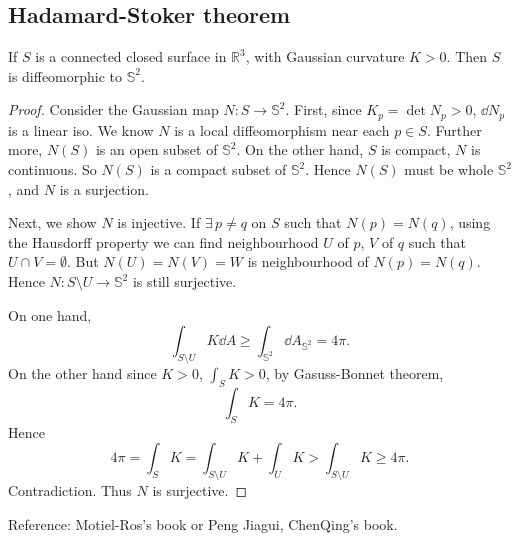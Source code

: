 \subsection{Hadamard-Stoker theorem}
\begin{theorem}
    If \(S\) is a connected closed surface in \(\mathbb{R}^3\), with Gaussian
    curvature \(K>0\). Then \(S\) is diffeomorphic to \(\mathbb{S}^2\).
\end{theorem}
\begin{proof}
    Consider the Gaussian map \(N\colon S\to \mathbb{S}^2\). First, since \(K_p=
    \det N_p>0\), \(\dd{N_p}\) is a linear iso. We know \(N\) is a local diffeomorphism
    near each \(p\in S\). Further more, \(N(S)\) is an open subset of \(\mathbb{S}^2\).
    On the other hand, \(S\) is compact, \(N\) is continuous. So \(N(S)\) is a
    compact subset of \(\mathbb{S}^2\). Hence \(N(S)\) must be whole \(\mathbb{S}^2\),
    and \(N\) is a surjection.
    
    Next, we show \(N\) is injective. If \(\exists\,p\neq q\) on \(S\) such that
    \(N(p)=N(q)\), using the Hausdorff property we can find neighbourhood
    \(U\) of \(p\), \(V\) of \(q\) such that \(U\cap V=\emptyset\). But \(N(U)=
    N(V)=W\) is neighbourhood of \(N(p)=N(q)\). Hence \(N\colon S\setminus U\to
    \mathbb{S}^2\) is still surjective.

    On one hand, \[
        \int_{S\setminus U}K\dd{A}\ge \int_{\mathbb{S}^2}\dd{A_{\mathbb{S}^2}}
        =4\pi
    .\] On the other hand since \(K>0\), \(\int_{S}K>0\), by Gasuss-Bonnet theorem, \[
        \int_{S}K=4\pi
    .\] Hence \[
        4\pi=\int_{S}K=\int_{S\setminus U}K+\int_{U}K>\int_{S\setminus U}K\ge 4\pi
    .\] Contradiction. Thus \(N\) is surjective.
\end{proof}
Reference: Motiel-Ros's book or Peng Jiagui, ChenQing's book.
